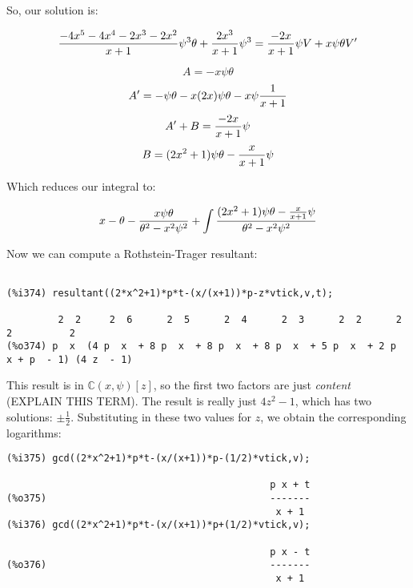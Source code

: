 So, our solution is:

$${{{-4x^5-4x^4-2x^3-2x^2}\over{x+1}}\psi^3\theta + {{2x^3}\over{x+1}}\psi^3}
  = {-2x\over{x+1}}\psi V + x\psi\theta V'$$

$$A = -x\psi\theta$$
$$A' = -\psi\theta - x(2x)\psi\theta - x\psi{1\over{x+1}}$$
$$A' + B = {-2x\over{x+1}}\psi$$
$$B = (2x^2+1)\psi\theta - {x\over{x+1}}\psi$$

Which reduces our integral to:


{\LARGE$$x - \theta - {x\psi\theta\over{\theta^2-x^2\psi^2}} +  \int{{(2x^2+1)\psi\theta - {x\over{x+1}}\psi}\over{\theta^2-x^2\psi^2}}$$}



Now we can compute a Rothstein-Trager resultant:

{\small\begin{verbatim}

(%i374) resultant((2*x^2+1)*p*t-(x/(x+1))*p-z*vtick,v,t);

         2  2     2  6      2  5      2  4      2  3      2  2      2      2          2
(%o374) p  x  (4 p  x  + 8 p  x  + 8 p  x  + 8 p  x  + 5 p  x  + 2 p  x + p  - 1) (4 z  - 1)
\end{verbatim}}

This result is in ${\mathbb C}(x,\psi)[z]$, so the first two factors are just
{\it content} (EXPLAIN THIS TERM).  The result is really just $4z^2-1$,
which has two solutions: $\pm\frac{1}{2}$.  Substituting in these two
values for $z$, we obtain the corresponding logarithms:

{\small\begin{verbatim}
(%i375) gcd((2*x^2+1)*p*t-(x/(x+1))*p-(1/2)*vtick,v);

                                              p x + t
(%o375)                                       -------
                                               x + 1
(%i376) gcd((2*x^2+1)*p*t-(x/(x+1))*p+(1/2)*vtick,v);

                                              p x - t
(%o376)                                       -------
                                               x + 1
\end{verbatim}}

